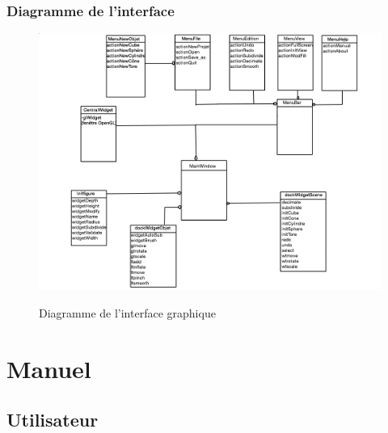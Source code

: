 \documentclass[a4paper]{memoir}
\begin{document}
			\subsection{Diagramme de l'interface}
				\begin{figure}[H]
				\begin{center}
					\includegraphics[scale=0.35]{img/diagramInterface.png}
					\label{fig:interface}
					\caption{Diagramme de l'interface graphique}
				\end{center}
			\end{figure}

	\chapter{Manuel}
		
		\section{Utilisateur}
\end{document}
